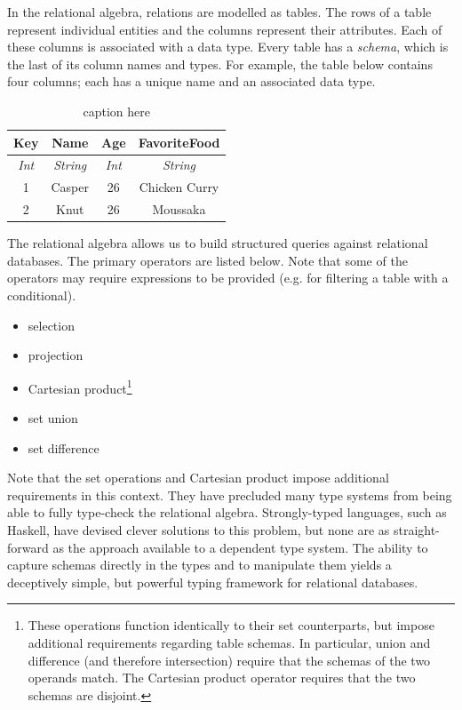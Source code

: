 \documentclass[12pt]{article}
\begin{document}
In the relational algebra, relations are modelled as tables.
The rows of a table represent individual entities and the columns represent their attributes.
Each of these columns is associated with a data type.
Every table has a \textit{schema}, which is the last of its column names and types.
For example, the table below contains four columns; each has a unique name and an associated data type.

\begin{table}[tb]
    \caption{caption here}
    \label{tab:tablename}
    \centering

    \begin{tabular}{|c|c|c|c|}
    \hline

    \hline
    \textbf{Key} & \textbf{Name} & \textbf{Age} & \textbf{FavoriteFood} \\
    \hline
    \textit{Int} & \textit{String} & \textit{Int} & \textit{String} \\
    \hline
    \hline
       1 & Casper & 26 & Chicken Curry \\
       2 & Knut & 26 & Moussaka \\
    \hline

    \end{tabular}
\end{table}

The relational algebra allows us to build structured queries against relational databases.
The primary operators are listed below.
Note that some of the operators may require expressions to be provided (e.g. for filtering a table with a conditional).

\begin{itemize}
    \item selection
    \item projection
    \item Cartesian product\footnote{\label{fn:set_ops} These operations function identically to their set counterparts, but impose additional requirements regarding table schemas. In particular, union and difference (and therefore intersection) require that the schemas of the two operands match. The Cartesian product operator requires that the two schemas are disjoint.}
    \item set union\footnotemark[\ref{fn:set_ops}]
    \item set difference\footnotemark[\ref{fn:set_ops}]
\end{itemize}

Note that the set operations and Cartesian product impose additional requirements in this context.
They have precluded many type systems from being able to fully type-check the relational algebra.
Strongly-typed languages, such as Haskell, have devised clever solutions to this problem, but none are as straight-forward as the approach available to a dependent type system.
The ability to capture schemas directly in the types and to manipulate them yields a deceptively simple, but powerful typing framework for relational databases.
\end{document}
